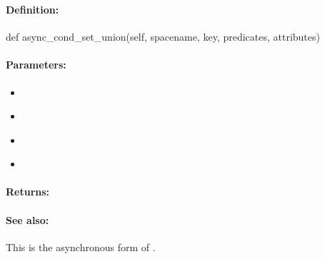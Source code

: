 \pagebreak
\subsubsection{}
\label{api:python:async_cond_set_union}


\paragraph{Definition:}
\begin{pythoncode}
def async_cond_set_union(self, spacename, key, predicates, attributes)
\end{pythoncode}

\paragraph{Parameters:}
\begin{itemize}[noitemsep]
\item {}\\

\item {}\\

\item {}\\

\item {}\\

\end{itemize}

\paragraph{Returns:}


\paragraph{See also:}  This is the asynchronous form of .

\pagebreak
\subsubsection{}
\label{api:python:map_add}


